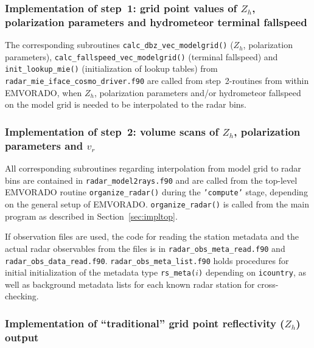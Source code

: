 \documentclass[10pt,a4paper,twoside,headinclude,footinclude,parskip=half]{scrartcl}
\newcommand{\myaktuellesection}{sec:intro}%
\newcommand{\labelsec}[1]{\label{#1}\renewcommand{\myaktuellesection}{#1}}%
\newcommand{\labelsec}[1]{\label{#1}}%
\newcommand{\srcform}[1]{\mbox{\texttt{#1}}\xspace}%
\begin{document}
\subsubsection{Implementation of step~1: grid point values of $Z_h$, polarization parameters and hydrometeor terminal fallspeed}

\labelsec{sec:impl1}

The corresponding subroutines \srcform{calc_dbz_vec_modelgrid()} ($Z_h$, polarization parameters), \srcform{calc_fallspeed_vec_modelgrid()} (terminal fallspeed) and \srcform{init_lookup_mie()} (initialization of lookup tables)
from \srcform{radar_mie_iface_cosmo_driver.f90}
are called from step~2-routines from within EMVORADO, when $Z_h$, polarization parameters and/or hydrometeor fallspeed on the model grid is needed to be
interpolated to the radar bins.


\subsubsection{Implementation of step~2: volume scans of $Z_h$, polarization parameters and $v_r$}

\labelsec{sec:impl2}

All corresponding subroutines regarding interpolation from model grid to radar bins
are contained in \srcform{radar_model2rays.f90} and are called from the top-level
EMVORADO routine \srcform{organize_radar()} during the \srcform{'compute'} stage, depending on the general
setup of EMVORADO. \srcform{organize_radar()} is called from the main program as described in Section~\ref{sec:impltop}.

If observation files are used, the code for reading the station metadata and the actual radar observables
from the files is in \srcform{radar_obs_meta_read.f90} and \srcform{radar_obs_data_read.f90}.
\srcform{radar_obs_meta_list.f90} holds procedures for initial initialization of
the metadata type \srcform{rs_meta($i$)} depending on \srcform{icountry}, as well
as background metadata lists for each known radar station for cross-checking.

\subsubsection{Implementation of ``traditional'' grid point reflectivity ($Z_h$) output}

\labelsec{sec:impltradi}
\end{document}
